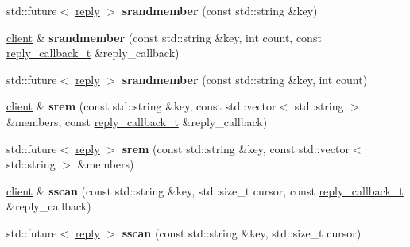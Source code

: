 \begin{DoxyCompactItemize}
std\+::future$<$ \hyperlink{classcpp__redis_1_1reply}{reply} $>$ {\bfseries srandmember} (const std\+::string \&key)
\item 
\mbox{\label{classcpp__redis_1_1client_a59e0a8886b5f4fa177e93053b9965827}} 
\hyperlink{classcpp__redis_1_1client}{client} \& {\bfseries srandmember} (const std\+::string \&key, int count, const \hyperlink{classcpp__redis_1_1client_a061a1140d36d2eaeda82b09a0bb3f9f2}{reply\+\_\+callback\+\_\+t} \&reply\+\_\+callback)
\item 
\mbox{\label{classcpp__redis_1_1client_a23913f257f58864d865d70bfe462caa4}} 
std\+::future$<$ \hyperlink{classcpp__redis_1_1reply}{reply} $>$ {\bfseries srandmember} (const std\+::string \&key, int count)
\item 
\mbox{\label{classcpp__redis_1_1client_a020849a43f10f56941ef98716440d817}} 
\hyperlink{classcpp__redis_1_1client}{client} \& {\bfseries srem} (const std\+::string \&key, const std\+::vector$<$ std\+::string $>$ \&members, const \hyperlink{classcpp__redis_1_1client_a061a1140d36d2eaeda82b09a0bb3f9f2}{reply\+\_\+callback\+\_\+t} \&reply\+\_\+callback)
\item 
\mbox{\label{classcpp__redis_1_1client_a542bc98a1968e22dfce3cd7051680b6f}} 
std\+::future$<$ \hyperlink{classcpp__redis_1_1reply}{reply} $>$ {\bfseries srem} (const std\+::string \&key, const std\+::vector$<$ std\+::string $>$ \&members)
\item 
\mbox{\label{classcpp__redis_1_1client_a96d9cbf57d4bb56f41d4681c657db256}} 
\hyperlink{classcpp__redis_1_1client}{client} \& {\bfseries sscan} (const std\+::string \&key, std\+::size\+\_\+t cursor, const \hyperlink{classcpp__redis_1_1client_a061a1140d36d2eaeda82b09a0bb3f9f2}{reply\+\_\+callback\+\_\+t} \&reply\+\_\+callback)
\item 
\mbox{\label{classcpp__redis_1_1client_af5828f278552142ccd9dfc700ac19a4c}} 
std\+::future$<$ \hyperlink{classcpp__redis_1_1reply}{reply} $>$ {\bfseries sscan} (const std\+::string \&key, std\+::size\+\_\+t cursor)
\item 
\mbox{\label{classcpp__redis_1_1client_a020b2980d1045441aee35fb207e5ef3c}} 

\end{DoxyCompactItemize}
